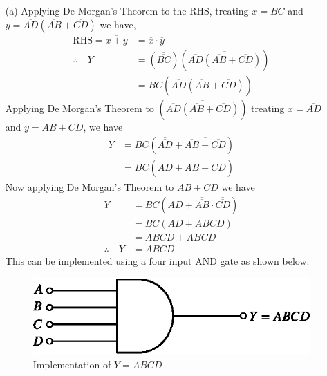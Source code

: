 \begin{solution}
\begin{itemize}
\item[(a)]
Applying De Morgan's Theorem to the RHS, treating $x=\overline{BC}$
and $y=\overline{AD}(\overline{AB}+\overline{CD})$ we have,
\begin{align*}
\text{RHS}=\overline{x+y} &= \overline{x}\cdot \overline{y}\\[2pt]
\therefore\quad Y &= (\overline{\overline{BC}})(\overline{\overline{AD}(\overline{AB}+\overline{CD})})\\[2pt]
&= BC(\overline{\overline{AD}(\overline{AB}+\overline{CD})})
\end{align*}
Applying De Morgan's Theorem to $(\overline{\overline{AD}(\overline{AB}+\overline{CD})})$ treating $x=\overline{AD}$ and $y=\overline{AB}+\overline{CD}$, we have
\begin{align*}
Y &= BC(\overline{\overline{AD}}+\overline{\overline{AB}+\overline{CD}})\\
  &= BC(AD+\overline{\overline{AB}+\overline{CD}})
\end{align*}
Now applying De Morgan's Theorem to $\overline{\overline{AB}+\overline{CD}}$ we have
\begin{align*}
Y &= BC(AD+\overline{\overline{AB}}\cdot \overline{\overline{CD}})\\
&= BC(AD+ABCD)\\
&= ABCD+ABCD\\[3pt]
\therefore\quad Y &= ABCD
\end{align*}
This can be implemented using a four input AND gate as shown below.
\begin{figure}[H]
\centering
\includegraphics{chap6/fig110.eps}
\caption*{Implementation of $Y=ABCD$}
\end{figure}


\end{itemize}
\end{solution}
